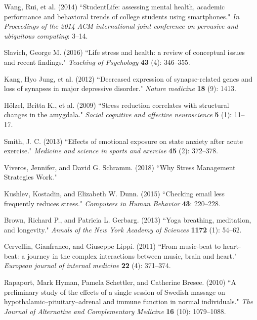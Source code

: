 \documentclass[3p,times,procedia]{elsarticle}
\begin{document}
\begin{thebibliography}{}

Wang, Rui, et al. (2014) ``StudentLife: assessing mental health, academic performance and behavioral trends of college students using smartphones." {\it In Proceedings of the 2014 ACM international joint conference on pervasive and ubiquitous computing}: 3--14.

Slavich, George M. (2016) ``Life stress and health: a review of conceptual issues and recent findings." {\it Teaching of Psychology} {\bf 43} (4): 346--355.

Kang, Hyo Jung, et al. (2012) ``Decreased expression of synapse-related genes and loss of synapses in major depressive disorder." {\it Nature medicine} {\bf 18} (9): 1413.

Hölzel, Britta K., et al. (2009) ``Stress reduction correlates with structural changes in the amygdala." {\it Social cognitive and affective neuroscience} {\bf 5} (1): 11--17.

Smith, J. C. (2013) ``Effects of emotional exposure on state anxiety after acute exercise." {\it Medicine and science in sports and exercise} {\bf 45} (2): 372--378.

Viveros, Jennifer, and David G. Schramm. (2018) ``Why Stress Management Strategies Work."

Kushlev, Kostadin, and Elizabeth W. Dunn. (2015) ``Checking email less frequently reduces stress." {\it Computers in Human Behavior} {\bf 43}: 220--228.

Brown, Richard P., and Patricia L. Gerbarg. (2013) ``Yoga breathing, meditation, and longevity." {\it Annals of the New York Academy of Sciences} {\bf 1172} (1): 54--62.

Cervellin, Gianfranco, and Giuseppe Lippi. (2011) ``From music-beat to heart-beat: a journey in the complex interactions between music, brain and heart." {\it European journal of internal medicine} {\bf 22} (4): 371--374.

Rapaport, Mark Hyman, Pamela Schettler, and Catherine Bresee. (2010) ``A preliminary study of the effects of a single session of Swedish massage on hypothalamic–pituitary–adrenal and immune function in normal individuals." {\it The Journal of Alternative and Complementary Medicine} {\bf 16} (10): 1079--1088.


\end{thebibliography}
\end{document}

